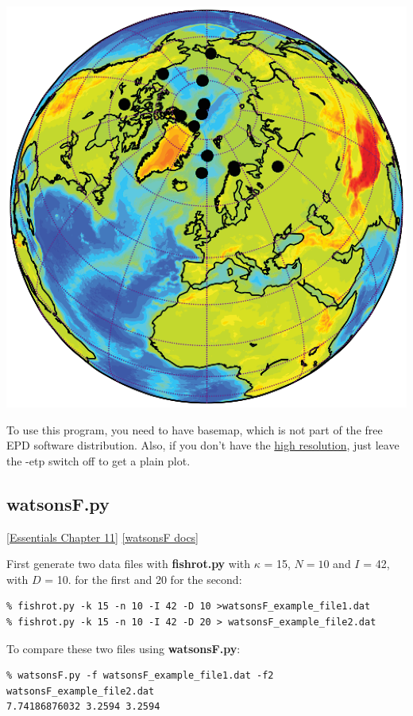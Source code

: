 \documentclass[11pt]{book}
\begin{document}
{{\includegraphics[width=15cm]{EPSfiles/VGP_map.eps}

To use this program, you need to have basemap, which is not part of the free EPD software distribution.  Also, if you don't have the  \href{http://earthref.org/PmagPy/hires.html}{high resolution}, just leave the -etp switch off to get a plain plot.  


\subsection{watsonsF.py}
\href{http://magician.ucsd.edu/Essentials_2/WebBook2ch11.html#ch11}{[Essentials Chapter 11]}
\href{http://earthref.org/PmagPy/pmagpydocs/watsonsF-module.html}{[watsonsF docs]}

First generate two data files with {\bf fishrot.py} with $\kappa$ = 15, $N=10$ and $I$ = 42, with $D$ = 10. for the first and 20 for the second:

\begin{verbatim}
% fishrot.py -k 15 -n 10 -I 42 -D 10 >watsonsF_example_file1.dat
% fishrot.py -k 15 -n 10 -I 42 -D 20 > watsonsF_example_file2.dat
\end{verbatim}

To compare these two files using {\bf watsonsF.py}:  

\begin{verbatim}
% watsonsF.py -f watsonsF_example_file1.dat -f2 watsonsF_example_file2.dat
7.74186876032 3.2594 3.2594
\end{verbatim}

}}
\end{document}
